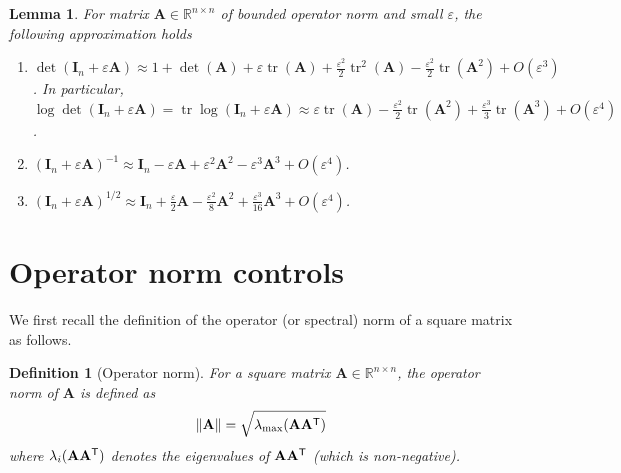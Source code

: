 \documentclass[MAL,biber]{nowfnt} %
\newtheorem{Lemma}{Lemma}
\newtheorem{Definition}{Definition}
\newcommand{\T}{{\sf T}}
\DeclareMathOperator{\tr}{tr}
\newcommand{\A}{{\mathbf{A}}}
\newcommand{\I}{{\mathbf{I}}}
\newcommand{\RR}{{\mathbb{R}}}
\begin{document}
\begin{Lemma}
For matrix $\A \in \RR^{n \times n}$ of bounded operator norm and small $\varepsilon$, the following approximation holds
\begin{enumerate}
    \item $\det (\I_n + \varepsilon \A) \approx 1 + \det(\A) + \varepsilon \tr (\A) + \frac{\varepsilon^2}2 \tr^2 (\A) - \frac{\varepsilon^2}2 \tr(\A^2) + O(\varepsilon^3)$. In particular, $\log \det (\I_n + \varepsilon \A) = \tr \log (\I_n + \varepsilon \A) \approx \varepsilon \tr (\A) - \frac{\varepsilon^2}2 \tr(\A^2) + \frac{\varepsilon^3}3 \tr(\A^3) + O(\varepsilon^4)$.
    \item $(\I_n + \varepsilon \A)^{-1} \approx \I_n - \varepsilon \A + \varepsilon^2 \A^2- \varepsilon^3 \A^3 + O(\varepsilon^4)$.
    \item $(\I_n + \varepsilon \A)^{1/2} \approx \I_n + \frac{\varepsilon}2 \A - \frac{\varepsilon^2}8 \A^2 + \frac{\varepsilon^3}{16} \A^3 + O(\varepsilon^4)$.
\end{enumerate}
\end{Lemma}

\section{Operator norm controls}
We first recall the definition of the operator (or spectral) norm of a square matrix as follows.
\begin{Definition}[Operator norm]
For a square matrix $\A \in \RR^{n \times n}$, the operator norm of $\A$ is defined as
\[
	\| \A \| = \sqrt{\lambda_{\max} (\A \A^\T)}
\]
where $\lambda_i(\A \A^\T)$ denotes the eigenvalues of $\A \A^\T$ (which is non-negative).
\end{Definition}
\end{document}
